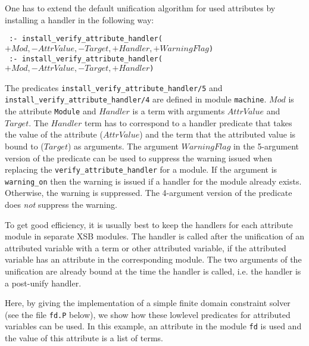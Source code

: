 One has to extend the default unification algorithm for used
attributes by installing a handler in the following way:

\noindent
{\tt
:- install\_verify\_attribute\_handler($+Mod, -AttrValue, -Target, +Handler, +WarningFlag$)}
\\
{\tt
  :- install\_verify\_attribute\_handler($+Mod, -AttrValue, -Target, +Handler$)}

\noindent The
predicates
\texttt{install\_verify\_attribute\_handler/5}
and
\texttt{install\_verify\_attribute\_handler/4}
are defined in module \texttt{machine}. $Mod$ is the
attribute {\tt Module} and $Handler$ is a term with arguments
$AttrValue$ and $Target$. The $Handler$ term has to correspond to a
handler predicate that takes the value of the attribute ($AttrValue$)
and the term that the attributed value is bound to ($Target$) as
arguments. The argument $WarningFlag$ in the 5-argument version of the
predicate can be used to suppress the warning issued when replacing the
{\tt verify\_attribute\_handler} for a module. If the argument is
{\tt warning\_on} then the warning is issued if a handler for the module
already exists. Otherwise, the warning is suppressed. 
The 4-argument version of the predicate does \emph{not} suppress the
warning. 

To get good efficiency, it is usually best to keep the
handlers for each attribute module in separate XSB modules.
The handler is called after the unification of an attributed variable
with a term or other attributed variable, if the attributed variable
has an attribute in the corresponding module. The two arguments of the
unification are already bound at the time the handler is called,
i.e. the handler is a post-unify handler.

Here, by giving the implementation of a simple finite domain
constraint solver (see the file \texttt{fd.P} below), we show how
these lowlevel predicates for attributed variables can be used.  In
this example, an attribute in the module \texttt{fd} is used and the
value of this attribute is a list of terms.

